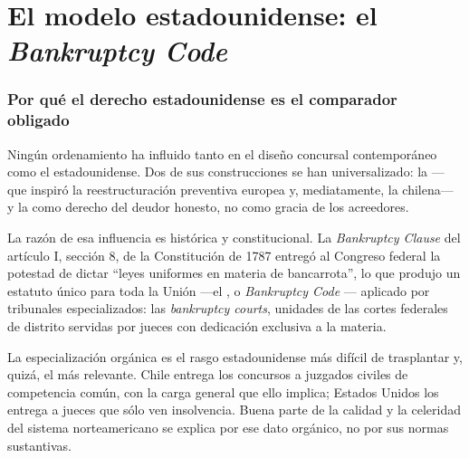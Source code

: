 \chapter{El modelo estadounidense: el \emph{Bankruptcy Code}}
\label{cap:comparado-eeuu}


\bloqueTeorico

\subsection{Por qué el derecho estadounidense es el comparador obligado}

Ningún ordenamiento ha influido tanto en el diseño concursal contemporáneo como el
estadounidense. Dos de sus construcciones se han universalizado: la  ---que inspiró la reestructuración preventiva europea y, mediatamente, la
\LIR{} chilena--- y la  como derecho del deudor honesto, no
como gracia de los acreedores.

La razón de esa influencia es histórica y constitucional. La \emph{Bankruptcy Clause} del artículo
I, sección 8, de la Constitución de 1787 entregó al Congreso federal la potestad de dictar
\enquote{leyes uniformes en materia de bancarrota}, lo que produjo un estatuto único para toda la
Unión ---el , o \emph{Bankruptcy Code}
\parencite{us-bankruptcy-code}--- aplicado por tribunales especializados: las \emph{bankruptcy
courts}, unidades de las cortes federales de distrito servidas por jueces con dedicación exclusiva
a la materia.

\begin{foco}
La especialización orgánica es el rasgo estadounidense más difícil de trasplantar y, quizá, el más
relevante. Chile entrega los concursos a juzgados civiles de competencia común, con la carga
general que ello implica; Estados Unidos los entrega a jueces que sólo ven insolvencia. Buena parte
de la calidad y la celeridad del sistema norteamericano se explica por ese dato orgánico, no por
sus normas sustantivas.
\end{foco}

